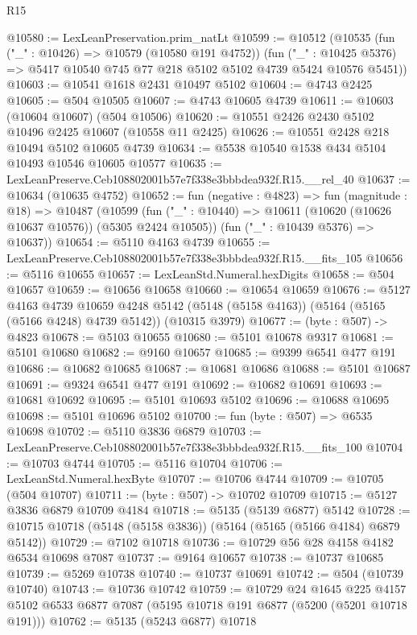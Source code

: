 \begin{lexlean}{R15}
\begin{coremodule}
{{{{{{{{{{{@10580 := LexLeanPreservation.prim_natLt
@10599 := @10512
    (@10535
      (fun ("_" : @10426) => @10579 (@10580 @191 @4752))
      (fun ("_" : @10425 @5376) => @5417 @10540 @745 @77 @218 @5102 @5102 @4739 @5424 @10576 @5451))
@10603 := @10541 @1618 @2431 @10497 @5102
@10604 := @4743 @2425
@10605 := @504 @10505
@10607 := @4743 @10605 @4739
@10611 := @10603 (@10604 @10607) (@504 @10506)
@10620 := @10551 @2426 @2430 @5102 @10496 @2425 @10607 (@10558 @11 @2425)
@10626 := @10551 @2428 @218 @10494 @5102 @10605 @4739
@10634 := @5538 @10540 @1538 @434 @5104 @10493 @10546 @10605 @10577
@10635 := LexLeanPreserve.Ceb108802001b57e7f338e3bbbdea932f.R15.__rel_40
@10637 := @10634 (@10635 @4752)
@10652 := fun (negative : @4823) =>
  fun (magnitude : @18) =>
  @10487
    (@10599
      (fun ("_" : @10440) => @10611 (@10620 (@10626 @10637 @10576)) (@5305 @2424 @10505))
      (fun ("_" : @10439 @5376) => @10637))
@10654 := @5110 @4163 @4739
@10655 := LexLeanPreserve.Ceb108802001b57e7f338e3bbbdea932f.R15.__fits_105
@10656 := @5116 @10655
@10657 := LexLeanStd.Numeral.hexDigits
@10658 := @504 @10657
@10659 := @10656 @10658
@10660 := @10654 @10659
@10676 := @5127
    @4163
    @4739
    @10659
    @4248
    @5142
    (@5148 (@5158 @4163))
    (@5164 (@5165 (@5166 @4248) @4739 @5142))
    (@10315 @3979)
@10677 := (byte : @507) -> @4823
@10678 := @5103 @10655
@10680 := @5101 @10678 @9317
@10681 := @5101 @10680
@10682 := @9160 @10657
@10685 := @9399 @6541 @477 @191
@10686 := @10682 @10685
@10687 := @10681 @10686
@10688 := @5101 @10687
@10691 := @9324 @6541 @477 @191
@10692 := @10682 @10691
@10693 := @10681 @10692
@10695 := @5101 @10693 @5102
@10696 := @10688 @10695
@10698 := @5101 @10696 @5102
@10700 := fun (byte : @507) => @6535 @10698
@10702 := @5110 @3836 @6879
@10703 := LexLeanPreserve.Ceb108802001b57e7f338e3bbbdea932f.R15.__fits_100
@10704 := @10703 @4744
@10705 := @5116 @10704
@10706 := LexLeanStd.Numeral.hexByte
@10707 := @10706 @4744
@10709 := @10705 (@504 @10707)
@10711 := (byte : @507) -> @10702 @10709
@10715 := @5127 @3836 @6879 @10709 @4184
@10718 := @5135 (@5139 @6877) @5142
@10728 := @10715 @10718 (@5148 (@5158 @3836)) (@5164 (@5165 (@5166 @4184) @6879 @5142))
@10729 := @7102 @10718
@10736 := @10729 @56 @28 @4158 @4182 @6534 @10698 @7087
@10737 := @9164 @10657
@10738 := @10737 @10685
@10739 := @5269 @10738
@10740 := @10737 @10691
@10742 := @504 (@10739 @10740)
@10743 := @10736 @10742
@10759 := @10729
    @24
    @1645
    @225
    @4157
    @5102
    @6533
    @6877
    @7087
    (@5195 @10718 @191 @6877 (@5200 (@5201 @10718 @191)))
@10762 := @5135 (@5243 @6877) @10718
}}}}}}}}}}}
\end{coremodule}
\end{lexlean}
